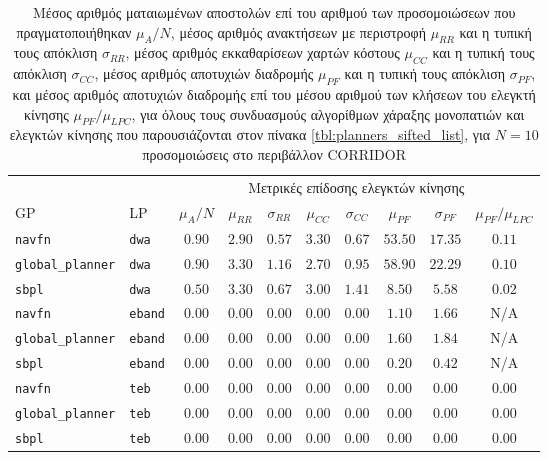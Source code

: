 \begin{table}[h]\hspace{-0.5cm}
\renewcommand{\arraystretch}{1.3}
\begin{tabular}{llcccccccc}
  & & \multicolumn{8}{c}{Μετρικές επίδοσης ελεγκτών κίνησης} \\
  \cline{3-10}
    GP & LP & $\mu_{A} / N$ & $\mu_{RR}$ & $\sigma_{RR}$ & $\mu_{CC}$ & $\sigma_{CC}$ & $\mu_{PF}$ & $\sigma_{PF}$ & $\mu_{PF} / \mu_{LPC}$ \\ \toprule
    \texttt{navfn} & \texttt{dwa} & $0.90$ & $2.90$ & $0.57$ & $3.30$ & $0.67$ & $53.50$ & $17.35$ & $0.11$ \\
    \texttt{global\_planner} & \texttt{dwa} & $0.90$ & $3.30$ & $1.16$ & $2.70$ & $0.95$ & $58.90$ & $22.29$ & $0.10$ \\
    \texttt{sbpl} & \texttt{dwa} & $0.50$ & $3.30$ & $0.67$ & $3.00$ & $1.41$ & $8.50$ & $5.58$ & $0.02$ \\
    \texttt{navfn} & \texttt{eband} & $0.00$ & $0.00$ & $0.00$ & $0.00$ & $0.00$ & $1.10$ & $1.66$ & N/A \\
    \texttt{global\_planner} & \texttt{eband} & $0.00$ & $0.00$ & $0.00$ & $0.00$ & $0.00$ & $1.60$ & $1.84$ & N/A \\
    \texttt{sbpl} & \texttt{eband} & $0.00$ & $0.00$ & $0.00$ & $0.00$ & $0.00$ & $0.20$ & $0.42$ & N/A \\
    \texttt{navfn} & \texttt{teb} & $0.00$ & $0.00$ & $0.00$ & $0.00$ & $0.00$ & $0.00$ & $0.00$ & $0.00$ \\
    \texttt{global\_planner} & \texttt{teb} & $0.00$ & $0.00$ & $0.00$ & $0.00$ & $0.00$ & $0.00$ & $0.00$ & $0.00$ \\
    \texttt{sbpl} & \texttt{teb} & $0.00$ & $0.00$ & $0.00$ & $0.00$ & $0.00$ & $0.00$ & $0.00$ & $0.00$ \\ \bottomrule
\end{tabular}
\caption{\small Μέσος αριθμός ματαιωμένων αποστολών επί του αριθμού των
      προσομοιώσεων που πραγματοποιήθηκαν $\mu_A / N$, μέσος αριθμός ανακτήσεων
      με περιστροφή $\mu_{RR}$ και η τυπική τους απόκλιση $\sigma_{RR}$, μέσος
      αριθμός εκκαθαρίσεων χαρτών κόστους $\mu_{CC}$ και η τυπική τους απόκλιση
      $\sigma_{CC}$, μέσος αριθμός αποτυχιών διαδρομής $\mu_{PF}$ και η τυπική
      τους απόκλιση $\sigma_{PF}$, και μέσος αριθμός αποτυχιών διαδρομής επί
      του μέσου αριθμού των κλήσεων του ελεγκτή κίνησης $\mu_{PF} / \mu_{LPC}$,
      για όλους τους συνδυασμούς αλγορίθμων χάραξης μονοπατιών και ελεγκτών
      κίνησης που παρουσιάζονται στον πίνακα \ref{tbl:planners_sifted_list},
      για $N=10$ προσομοιώσεις στο περιβάλλον CORRIDOR}
\label{tbl:info_failures_corridor}
\end{table}



